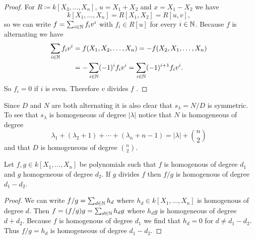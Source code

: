 \begin{expl}[]
\begin{proof}
    For $R \coloneqq k[X_3, \dotsc, X_n]$, $u = X_1 + X_2$ and $x = X_1 - X_2$ we have
    \[
        k[X_1, \dotsc, X_n]
      = R[X_1, X_2]
      = R[u,v],
    \]
    so we can write $f = \sum_{i \in \mathbb{N}} f_i v^i$ with $f_i \in R[u]$ for every $i \in \mathbb{N}$.
    Because $f$ is alternating we have
    \begin{align*}
           \sum_{i \in \mathbb{N}} f_i v^i
      &=   f(X_1, X_2, \dotsc, X_n)
       =  -f(X_2, X_1, \dotsc, X_n) \\
      &=  -\sum_{i \in \mathbb{N}} (-1)^i f_i v^i
       =   \sum_{i \in \mathbb{N}} (-1)^{i+1} f_i v^i.
    \end{align*}
    So $f_i = 0$ if $i$ is even.
    Therefore $v$ divides $f$ .
  \end{proof}
  Since $D$ and $N$ are both alternating it is also clear that $s_\lambda = N/D$ is symmetric.
  To see that $s_\lambda$ is homogeneous of degree $|\lambda|$ notice that $N$ is homogeneous of degree
  \[
      \lambda_1 + (\lambda_2 + 1) + \dotsb + (\lambda_n + n-1)
    = |\lambda| + \binom{n}{2}
  \]
  and that $D$ is homogeneous of degree $\binom{n}{2}$.
  \begin{claim}
    Let $f, g \in k[X_1, \dotsc, X_n]$ be polynomials such that $f$ is homogenous of degree $d_1$ and $g$ homogeneous of degree $d_2$.
    If $g$ divides $f$ then $f/g$ is homogenous of degree $d_1 - d_2$.
  \end{claim}
  \begin{proof}
    We can write $f/g = \sum_{d \in \mathbb{N}} h_d$ where $h_d \in k[X_1, \dotsc, X_n]$ is homogenous of degree $d$.
    Then $f = (f/g)g = \sum_{d \in \mathbb{N}} h_d g$ where $h_d g$ is homogeneous of degree $d + d_2$.
    Because $f$ is homogenous of degree $d_1$ we find that $h_d = 0$ for $d \neq d_1 - d_2$.
    Thus $f/g = h_d$ is homogeneous of degree $d_1 - d_2$.
  \end{proof}
\end{expl}



